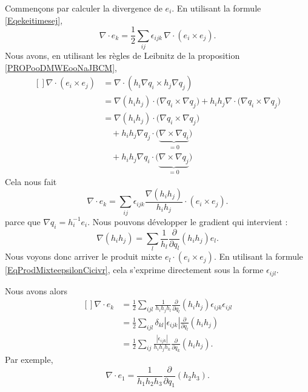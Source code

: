 Commençons par calculer la divergence de $e_i$. En utilisant la formule \eqref{Eqekeitimesej},
\begin{equation}
	\nabla\cdot e_k=\frac{ 1 }{2}\sum_{ij}\epsilon_{ijk}\,\nabla\cdot (e_i\times e_j).
\end{equation}
Nous avons, en utilisant les règles de Leibnitz de la proposition \ref{PROPooDMWEooNaJBCM},
\begin{equation}
	\begin{aligned}[]
		\nabla\cdot(e_i\times e_j) & =\nabla\cdot(h_i\nabla q_i\times h_j\nabla q_j)                                                                    \\
		                           & =\nabla(h_ih_j)\cdot\big( \nabla q_i\times\nabla q_j \big)+h_ih_j\nabla\cdot\big( \nabla q_i\times\nabla q_j \big) \\
		                           & =\nabla(h_ih_j)\cdot\big( \nabla q_i\times\nabla q_j \big)                                                         \\
		                           & \quad+h_ih_j\nabla q_j\cdot\big( \underbrace{\nabla\times\nabla q_i}_{=0} \big)                                    \\
		                           & \quad+h_ih_j\nabla q_i\cdot\big( \underbrace{\nabla\times\nabla q_j}_{=0} \big)
	\end{aligned}
\end{equation}
Cela nous fait
\begin{equation}
	\nabla\cdot e_k=\sum_{ij}\epsilon_{ijk}\frac{ \nabla(h_ih_j) }{ h_ih_j }\cdot (e_i\times e_j).
\end{equation}
parce que $\nabla q_i=h_i^{-1}e_i$. Nous pouvons développer le gradient qui intervient :
\begin{equation}
	\nabla(h_ih_j)=\sum_l\frac{1}{ h_l }\frac{ \partial  }{ \partial q_l }(h_ih_j)e_l.
\end{equation}
Nous voyons donc arriver le produit mixte $e_l\cdot (e_i\times e_j)$. En utilisant la formule \eqref{EqProdMixteepsilonCicivr}, cela s'exprime directement sous la forme $\epsilon_{ijl}$.

Nous avons alors
\begin{equation}        \label{EqFragradekdvi}
	\begin{aligned}[]
		\nabla\cdot e_k & =\frac{ 1 }{2}\sum_{ijl}\frac{1}{ h_ih_jh_l }\frac{ \partial  }{ \partial q_l }(h_ih_j)\epsilon_{ijk}\epsilon_{ijl} \\
		                & =\frac{ 1 }{2}\sum_{ijl}\delta_{kl}| \epsilon_{ijk} |\frac{ \partial  }{ \partial q_l }(h_ih_j)                     \\
		                & =\frac{ 1 }{2}\sum_{ij}\frac{| \epsilon_{ijk} |}{ h_ih_jh_k }\frac{ \partial  }{ \partial q_k }(h_ih_j).
	\end{aligned}
\end{equation}
Par exemple,
\begin{equation}
	\nabla\cdot e_1=\frac{1}{ h_1h_2h_3 }\frac{ \partial  }{ \partial q_1 }(h_2h_3).
\end{equation}


